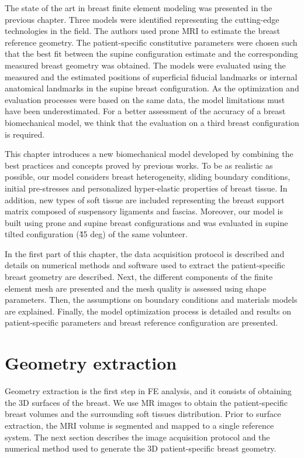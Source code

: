 
The state of the art in breast finite element modeling was presented in the previous chapter. Three models were identified representing the cutting-edge technologies in the field. The authors used prone MRI to estimate the breast reference geometry. The patient-specific constitutive parameters were chosen such that the best fit between the supine configuration estimate and the corresponding measured breast geometry was obtained. The models were evaluated using the measured and the estimated positions of superficial fiducial landmarks or internal anatomical landmarks in the supine breast configuration. As the optimization and evaluation  processes were based on the same data, the model limitations must have been underestimated. For a better assessment of the accuracy of a breast biomechanical model, we think that the evaluation on a third breast configuration is required.

 This chapter introduces a new biomechanical model developed by combining the best practices and concepts proved by previous works. To be as realistic as possible, our model considers breast heterogeneity, sliding boundary conditions, initial pre-stresses and personalized hyper-elastic properties of breast tissue. In addition, new types of soft tissue are included representing the breast support matrix composed of suspensory ligaments and fascias. Moreover, our model is built using prone and supine breast configurations and was evaluated in supine tilted configuration (\~ 45 deg) of the same volunteer.

In the first part of this chapter, the data acquisition protocol is described and details on numerical methods and software used to extract the patient-specific breast geometry are described. Next, the different components of the finite element mesh are presented and the mesh quality is assessed using shape parameters.  Then, the assumptions on boundary conditions and materials models are explained. Finally, the model optimization process is detailed and results on patient-specific parameters and breast reference configuration are presented.   
\clearpage
\section{Geometry extraction}\label{section:geometryextraction}

Geometry extraction is the first step in FE analysis, and it consists of obtaining the 3D surfaces of the
breast. We use MR images to obtain the patient-specific breast volumes and the surrounding soft tissues distribution. Prior to surface extraction, the MRI volume is segmented and mapped to a single reference system. The next section describes the image acquisition protocol and the numerical method used to generate the 3D patient-specific breast geometry.

